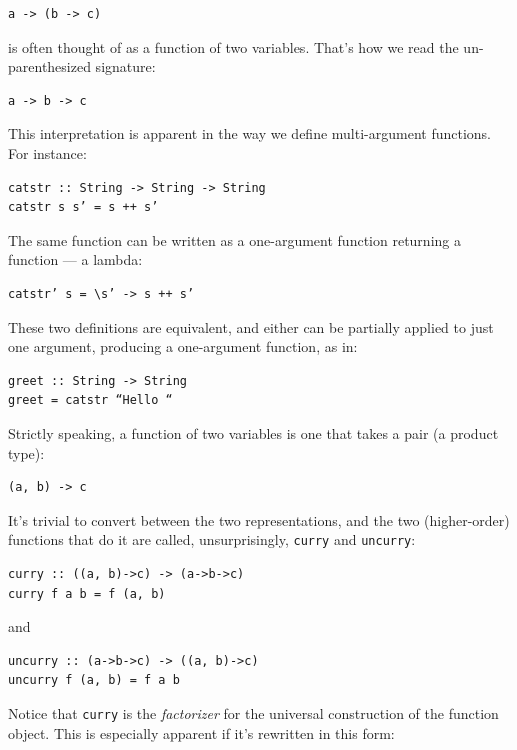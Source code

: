 \begin{verbatim}
a -> (b -> c)
\end{verbatim}

is often thought of as a function of two variables. That's how we read
the un-parenthesized signature:

\begin{verbatim}
a -> b -> c
\end{verbatim}

This interpretation is apparent in the way we define multi-argument
functions. For instance:

\begin{verbatim}
catstr :: String -> String -> String
catstr s s’ = s ++ s’
\end{verbatim}

The same function can be written as a one-argument function returning a
function --- a lambda:

\begin{verbatim}
catstr’ s = \s’ -> s ++ s’
\end{verbatim}

These two definitions are equivalent, and either can be partially
applied to just one argument, producing a one-argument function, as in:

\begin{verbatim}
greet :: String -> String
greet = catstr “Hello “
\end{verbatim}

Strictly speaking, a function of two variables is one that takes a pair
(a product type):

\begin{verbatim}
(a, b) -> c
\end{verbatim}

It's trivial to convert between the two representations, and the two
(higher-order) functions that do it are called, unsurprisingly,
\texttt{curry} and \texttt{uncurry}:

\begin{verbatim}
curry :: ((a, b)->c) -> (a->b->c)
curry f a b = f (a, b)
\end{verbatim}

and

\begin{verbatim}
uncurry :: (a->b->c) -> ((a, b)->c)
uncurry f (a, b) = f a b
\end{verbatim}

Notice that \texttt{curry} is the \emph{factorizer} for the universal
construction of the function object. This is especially apparent if it's
rewritten in this form:

